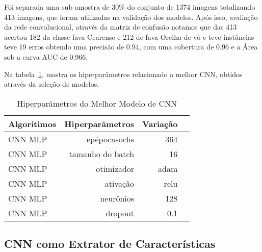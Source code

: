 Foi separada uma sub amostra de 30\% do conjunto de 1374 imagens totalizando 413 imagens, que foram utilizadas na validação dos modelos. Após isso, avaliação da rede convolucional, através da matriz de confusão notamos que das 413 acertou 182 da classe fava Cearense e 212 de fava Orelha de vó e teve instâncias teve 19 erros obtendo uma precisão de 0.94, com uma cobertura de 0.96 e a Área sob a curva AUC de 0.966.

Na tabela~\ref{tabela:hiperparametros_best_models_}, mostra os hiperparâmetros relacionado a melhor CNN, obtidos através da seleção de modelos.

\begin{table}[H]
\centering
\caption{Hiperparâmetros do Melhor Modelo de CNN }
\label{tabela:hiperparametros_best_models_}
\def\arraystretch{1.2}
\begin{tabular}{@{}lrrr@{}}
\toprule
{\textbf{Algoritimos}} & {\textbf{Hiperparâmetros}} & {\textbf{Variação}}  \\
\midrule
CNN MLP & epépocasochs & 364 \\ 
CNN MLP & tamanho do batch & 16\\ 
CNN MLP & otimizador & adam \\
CNN MLP & ativação & relu \\
CNN MLP & neurônios & 128 \\
CNN MLP & dropout & 0.1 \\
\bottomrule
\end{tabular}
\end{table}


\subsection{CNN como Extrator de Características}



